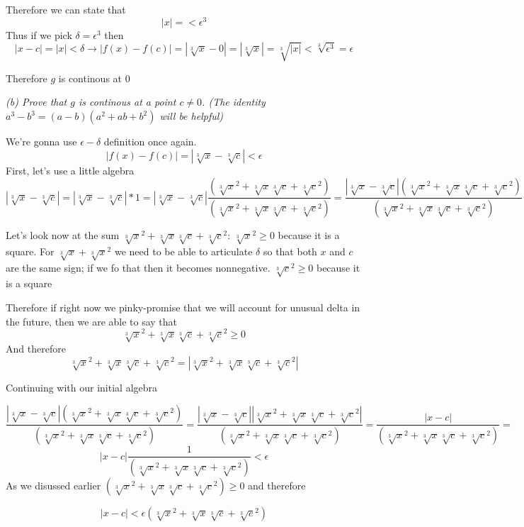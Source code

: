 \documentclass[11pt,oneside,titlepage]{article}
\begin{document}
Therefore we can state that 
$$|x| =  < \epsilon ^ 3$$ 
Thus if we pick $\delta = \epsilon ^ 3$ then
$$|x - c| = |x| < \delta \to |f(x) - f(c)| = |\sqrt[3]{x} - 0| = |\sqrt[3]{x}|
= \sqrt[3]{|x|} < \sqrt[3]{\epsilon^3} =  \epsilon $$

Therefore $g$ is continous at 0

\textit{(b) Prove that $g$ is continous at a point $c \neq 0$. (The identity
  $a^3 - b^3 = (a - b)(a ^ 2 + ab + b^2)$ will be helpful)}

We're gonna use $\epsilon-\delta$ definition once again.
$$|f(x) - f(c)| = |\sqrt[3]{x} - \sqrt[3]{c}| < \epsilon$$
First, let's use a little algebra
$$|\sqrt[3]{x} - \sqrt[3]{c}| = |\sqrt[3]{x} - \sqrt[3]{c}| * 1 =
|\sqrt[3]{x} - \sqrt[3]{c}|\frac{(\sqrt[3]{x}^2 + \sqrt[3]{x}\sqrt[3]{c} +
  \sqrt[3]{c} ^ 2)}{(\sqrt[3]{x}^2 + \sqrt[3]{x}\sqrt[3]{c}
  + \sqrt[3]{c} ^ 2)} = \frac{|\sqrt[3]{x} - \sqrt[3]{c}|(\sqrt[3]{x}^2 + \sqrt[3]{x}\sqrt[3]{c} +
  \sqrt[3]{c} ^ 2)}{(\sqrt[3]{x}^2 + \sqrt[3]{x}\sqrt[3]{c}
  + \sqrt[3]{c} ^ 2)}$$

Let's look now at the sum  $\sqrt[3]{x} ^ 2 + \sqrt[3]{x}\sqrt[3]{c} +
\sqrt[3]{c}^2$: $\sqrt[3]{x} ^ 2 \geq 0 $ because it is a square. For
$\sqrt[3]{x} + \sqrt[3]{x} ^ 2$ we need to be able to articulate $\delta$ so
that both $x$ and $c$ are the same sign; if we fo that then it becomes
nonnegative. $\sqrt[3]{c} ^ 2 \geq 0 $ because it is a square

Therefore if right now we pinky-promise that we will account for unusual delta
in the future, then we are able to say that 
$$\sqrt[3]{x} ^ 2 + \sqrt[3]{x}\sqrt[3]{c} + \sqrt[3]{c}^2 \geq 0 $$
And therefore
$$\sqrt[3]{x} ^ 2 + \sqrt[3]{x}\sqrt[3]{c} + \sqrt[3]{c}^2 =
|\sqrt[3]{x} ^ 2 + \sqrt[3]{x}\sqrt[3]{c} + \sqrt[3]{c}^2| $$

Continuing with our initial algebra

$$\frac{|\sqrt[3]{x} - \sqrt[3]{c}|(\sqrt[3]{x}^2 + \sqrt[3]{x}\sqrt[3]{c} +
  \sqrt[3]{c} ^ 2)}{(\sqrt[3]{x}^2 + \sqrt[3]{x}\sqrt[3]{c}
  + \sqrt[3]{c} ^ 2)} =
\frac{|\sqrt[3]{x} - \sqrt[3]{c}||\sqrt[3]{x}^2 + \sqrt[3]{x}\sqrt[3]{c} +
  \sqrt[3]{c} ^ 2|}{(\sqrt[3]{x}^2 + \sqrt[3]{x}\sqrt[3]{c}
  + \sqrt[3]{c} ^ 2)} =
\frac{|x - c|}{(\sqrt[3]{x}^2 + \sqrt[3]{x}\sqrt[3]{c}
  + \sqrt[3]{c} ^ 2)} =
$$
$$ |x - c|\frac{1}{(\sqrt[3]{x}^2 + \sqrt[3]{x}\sqrt[3]{c}
  + \sqrt[3]{c} ^ 2)} < \epsilon
$$
As we disussed earlier $(\sqrt[3]{x}^2 + \sqrt[3]{x}\sqrt[3]{c}  +
\sqrt[3]{c} ^ 2) \geq 0$ and therefore 

$$ |x - c| < \epsilon(\sqrt[3]{x}^2 + \sqrt[3]{x}\sqrt[3]{c}
+ \sqrt[3]{c} ^ 2) $$
\end{document}
